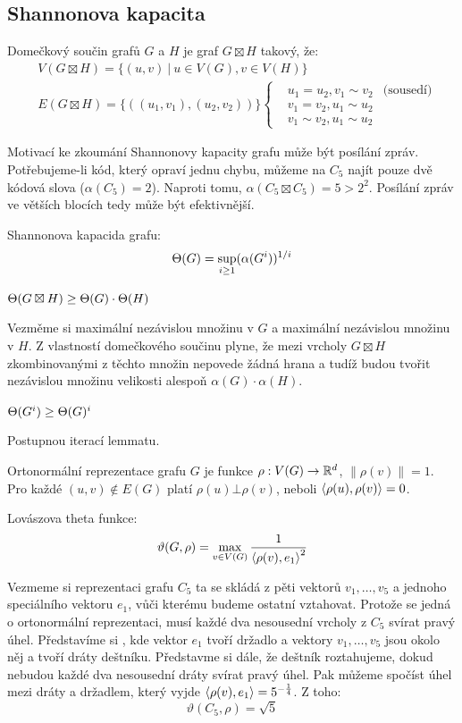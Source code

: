 \subsection{Shannonova kapacita}


\df Domečkový součin grafů $G$ a $H$ je graf $G \boxtimes H$ takový, že:
\begin{align*}
	&V(G \boxtimes H) = \{ (u,v) \ |\  u\in V(G), v\in V(H) \} \\
	&E(G \boxtimes H) = \{ ((u_1,v_1),(u_2,v_2))\} \left\{\begin{matrix}
		&u_1 = u_2, v_1 \sim v_2 &\text{(sousedí)} \\
		&v_1 = v_2, u_1 \sim u_2 \\
		&v_1 \sim v_2, u_1 \sim u_2
		\end{matrix}\right.
\end{align*}

Motivací ke zkoumání Shannonovy kapacity grafu může být posílání zpráv.
Potřebujeme-li kód, který opraví jednu chybu, můžeme na $C_5$ najít pouze dvě
kódová slova ($\alpha(C_5) = 2$). Naproti tomu, $\alpha(C_5 \boxtimes C_5) = 5
> 2^2$. Posílání zpráv ve větších blocích tedy může být efektivnější.

\df Shannonova kapacida grafu:
$$\Theta(G) = \sup_{i\ge 1}(\alpha(G^i))^{1/i}$$

\lm $\Theta(G\boxtimes H) \ge \Theta(G) \cdot \Theta(H)$

\dk Vezměme si maximální nezávislou množinu v $G$ a maximální nezávislou
množinu v $H$. Z vlastností domečkového součinu plyne, že mezi vrcholy
$G\boxtimes H$ zkombinovanými z těchto množin nepovede žádná hrana a tudíž
budou tvořit nezávislou množinu velikosti alespoň $\alpha(G)\cdot\alpha(H)$.

\poz $\Theta(G^i) \ge \Theta(G)^i$

\dk Postupnou iterací lemmatu.

\df Ortonormální reprezentace grafu $G$ je funkce $\rho: V(G) \rightarrow \mathbb{R}^d$,
$\|\rho(v)\| = 1$. Pro každé $(u,v) \not\in E(G)$ platí $\rho(u)\bot\rho(v)$,
neboli ${\langle \rho(u), \rho(v)\rangle} = 0$.

\df Lovászova theta funkce:
$$\vartheta(G,\rho) = \max_{v\in V(G)} {1\over {\langle \rho(v),e_1\rangle}^2}$$

Vezmeme si reprezentaci grafu $C_5$ ta se skládá z pěti vektorů $v_1, \dots,
v_5$ a jednoho speciálního vektoru $e_1$, vůči kterému budeme ostatní
vztahovat. Protože se jedná o ortonormální reprezentaci, musí každé dva
nesousední vrcholy z $C_5$ svírat pravý úhel. Představíme si ,
kde vektor $e_1$ tvoří držadlo a vektory $v_1, \dots, v_5$ jsou okolo něj a
tvoří dráty deštníku. Představme si dále, že deštník roztahujeme, dokud nebudou každé dva nesousední dráty svírat pravý úhel. Pak můžeme spočíst úhel mezi dráty a držadlem, který vyjde ${\langle \rho(v),e_1\rangle} = 5^{-{1\over 4}}$. Z toho:
$$
\vartheta(C_5,\rho) = \sqrt 5
$$

